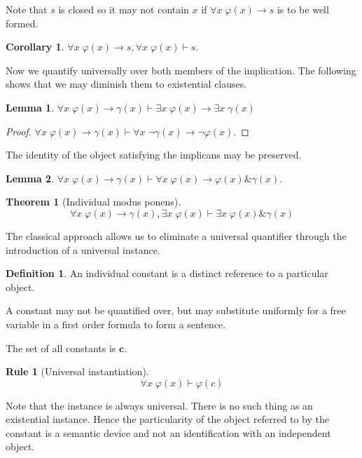 \documentclass{amsbook}
\newcommand{\infers}{\mathrel\vdash}
\newcommand{\univ}[1]{\mathord\forall#1\;}
\newcommand{\exis}[1]{\mathord\exists#1\;}
\newcommand{\then}{\mathrel\rightarrow}
\newcommand{\conj}{\mathrel\&}
\theoremstyle{definition}
\newtheorem{frule}{Rule}[chapter]
\newtheorem{thm}{Theorem}[section]
\newtheorem{lmm}{Lemma}[section]
\newtheorem{crl}{Corollary}[section]
\newtheorem{dfn}{Definition}[section]
\begin{document}
Note that $s$ is closed so it may not contain $x$ if $\univ x \varphi(x) \then s$ is to be well formed.

\begin{crl}
    $\univ x \varphi(x) \then s, \univ x \varphi(x) \infers s$.
\end{crl}

Now we quantify universally over both members of the implication. The following shows that we may diminish them to existential clauses.

\begin{lmm}
    $\univ x \varphi(x) \then \gamma(x) \infers \exis x \varphi(x) \then \exis x \gamma(x)$
    \begin{proof}
        $\univ x \varphi(x) \then \gamma(x) \infers \univ x \neg\gamma(x) \then \neg\varphi(x)$.
    \end{proof}
\end{lmm}

The identity of the object satisfying the implicans may be preserved.

\begin{lmm}
    $\univ x \varphi(x) \then \gamma(x) \infers \univ x \varphi(x) \then \varphi(x) \conj \gamma(x)$.
\end{lmm}

\begin{thm}[Individual modus ponens]
    $$\univ x \varphi(x) \then \gamma(x), \exis x \varphi(x) \infers \exis x \varphi(x) \conj \gamma(x)$$
\end{thm}

The classical approach allows us to eliminate a universal quantifier through the introduction of a universal instance.

\begin{dfn}
    An individual constant is a distinct reference to a particular object.

    A constant may not be quantified over, but may substitute uniformly for a free variable in a first order formula to form a sentence.

    The set of all constants is $\mathbf c$.
\end{dfn}

\begin{frule}[Universal instantiation]
    $$\univ x \varphi(x) \infers \varphi(c)$$
\end{frule}

Note that the instance is always universal. There is no such thing as an existential instance. Hence the particularity of the object referred to by the constant is a semantic device and not an identification with an independent object.
\end{document}
